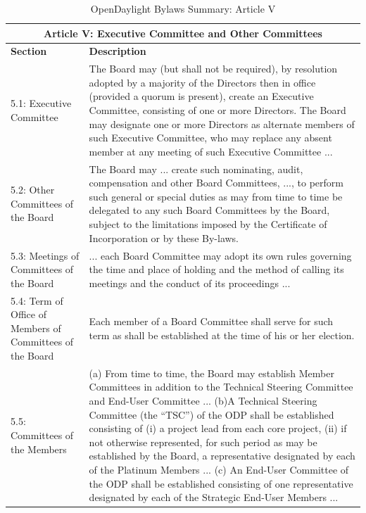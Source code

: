 \documentclass[a4paper, 12pt]{book}
\begin{document}
\begin{table}[H]
  \begin{center}
    \begin{tabular}{ | p{4cm} | p{11cm} | }
    \toprule
    \multicolumn {2}{|c|}{\textbf{Article V: Executive Committee and Other Committees}} \\
    \hline
    \textbf{Section} & \textbf{Description} \\
    \hline
    5.1: Executive Committee & The Board may (but shall not be required), by resolution adopted by a majority of the Directors then in office (provided a quorum is present), create an Executive Committee, consisting of one or more Directors.  The Board may designate one or more Directors as alternate members of such Executive Committee, who may replace any absent member at any meeting of such Executive Committee ...\\
    \hline
    5.2: Other Committees of the Board & The Board may ... create such nominating, audit, compensation and other Board Committees, ..., to perform such general or special duties as may from time to time be delegated to any such Board Committees by the Board, subject to the limitations imposed by the Certificate of Incorporation or by these By-laws.\\
    \hline
    5.3: Meetings of Committees of the Board & ... each Board Committee may adopt its own rules governing the time and place of holding and the method of calling its meetings and the conduct of its proceedings ...\\
    \hline
    5.4: Term of Office of Members of Committees of the Board & Each member of a Board Committee shall serve for such term as shall be established at the time of his or her election. \\
    \hline
    5.5: Committees of the Members & (a) From time to time, the Board may establish Member Committees in addition to the Technical Steering Committee and End-User Committee ... (b)A Technical Steering Committee (the “TSC”) of the ODP shall be established consisting of (i) a project lead from each core project, (ii) if not otherwise represented, for such period as may be established by the Board, a representative designated by each of the Platinum Members ... (c)  An End-User Committee of the ODP shall be established consisting of one representative designated by each of the Strategic End-User Members ...\\
    \bottomrule
    \end{tabular}
    \caption{OpenDaylight Bylaws Summary: Article V}
    \label{tab:odlbylaws-art05}
  \end{center}
\end{table}
\end{document}

